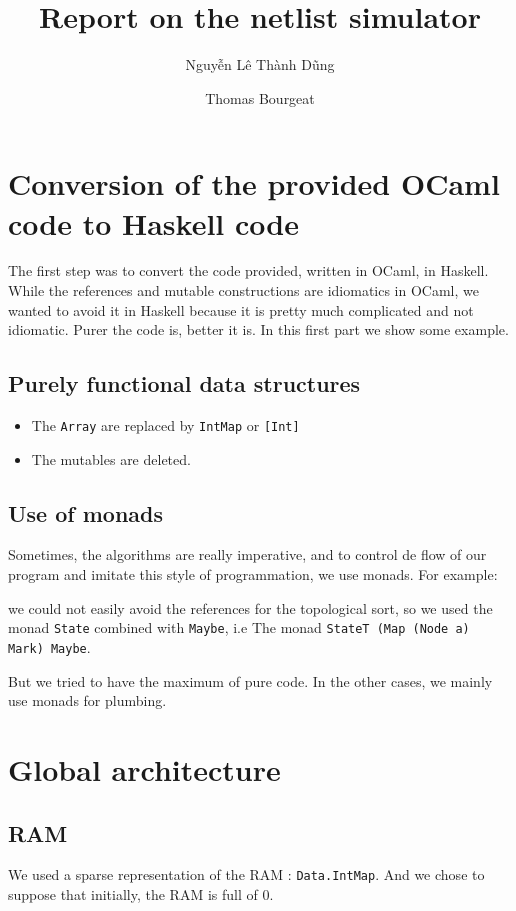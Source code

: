 \documentclass[a4paper, 11pt]{article}
\newcommand\co[1]{\texttt{#1}}
\begin{document}
\title{Report on the netlist simulator}
\author{Nguyễn Lê Thành Dũng \and Thomas Bourgeat}

\maketitle

\section{Conversion of the provided OCaml code to Haskell code }
The first step was to convert the code provided, written in OCaml, in
Haskell. While the references and mutable constructions are idiomatics in
OCaml, we wanted to avoid it in Haskell because it is pretty much
complicated and not idiomatic. Purer the code is, better it
is. In this first part we show some example.

\subsection{Purely functional data structures}
\begin{itemize}
\item The \co{Array} are replaced by \co{IntMap} or \co{[Int]}
\item The mutables are deleted.
\end{itemize}

\subsection{Use of monads}
Sometimes, the algorithms are really imperative, and to control de flow of
our program and imitate this style of programmation, we use monads. For
example:

 we could not easily avoid the references for the topological sort, so we
used the monad \co{State} combined with \co{Maybe}, i.e The monad \co{StateT
(Map (Node a) Mark) Maybe}.


But we tried to have the maximum of pure code. In the other cases, we
mainly use monads for plumbing. 

\section{Global architecture}

\subsection{RAM}
We used a sparse representation of the RAM : \co{Data.IntMap}. And we
chose to suppose that initially, the RAM is full of $0$. 
\end{document}
